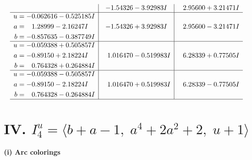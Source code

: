 \documentclass[1p]{elsarticle_modified}
\theoremstyle{definition}
\begin{document}
$$\begin{array}{c|c|c}
 & -1.54326 - 3.92983 I & \phantom{-}2.95600 + 3.21471 I \\ \hline\begin{aligned}
u &= -0.062616 - 0.525185 I \\
a &= \phantom{-}1.28999 - 2.16247 I \\
b &= -0.857635 - 0.387749 I\end{aligned}
 & -1.54326 + 3.92983 I & \phantom{-}2.95600 - 3.21471 I \\ \hline\begin{aligned}
u &= -0.059388 + 0.505857 I \\
a &= -0.89150 + 2.18224 I \\
b &= \phantom{-}0.764328 + 0.264884 I\end{aligned}
 & \phantom{-}1.016470 - 0.519983 I & \phantom{-}6.28339 + 0.77505 I \\ \hline\begin{aligned}
u &= -0.059388 - 0.505857 I \\
a &= -0.89150 - 2.18224 I \\
b &= \phantom{-}0.764328 - 0.264884 I\end{aligned}
 & \phantom{-}1.016470 + 0.519983 I & \phantom{-}6.28339 - 0.77505 I\\
 \hline 
 \end{array}$$\newpage\newpage\renewcommand{\arraystretch}{1}
\centering \section*{IV. $I^u_{4}= \langle b+a-1,\;a^4+2 a^2+2,\;u+1 \rangle$}
\flushleft \textbf{(i) Arc colorings}\\
\end{document}
